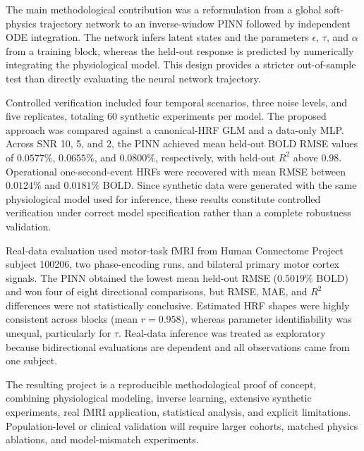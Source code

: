The main methodological contribution was a reformulation from a global soft-physics trajectory network to an inverse-window PINN followed by independent ODE integration. The network infers latent states and the parameters $\epsilon$, $\tau$, and $\alpha$ from a training block, whereas the held-out response is predicted by numerically integrating the physiological model. This design provides a stricter out-of-sample test than directly evaluating the neural network trajectory.

Controlled verification included four temporal scenarios, three noise levels, and five replicates, totaling 60 synthetic experiments per model. The proposed approach was compared against a canonical-HRF GLM and a data-only MLP. Across SNR 10, 5, and 2, the PINN achieved mean held-out BOLD RMSE values of $0.0577\%$, $0.0655\%$, and $0.0800\%$, respectively, with held-out $R^2$ above $0.98$. Operational one-second-event HRFs were recovered with mean RMSE between $0.0124\%$ and $0.0181\%$ BOLD. Since synthetic data were generated with the same physiological model used for inference, these results constitute controlled verification under correct model specification rather than a complete robustness validation.

Real-data evaluation used motor-task fMRI from Human Connectome Project subject 100206, two phase-encoding runs, and bilateral primary motor cortex signals. The PINN obtained the lowest mean held-out RMSE ($0.5019\%$ BOLD) and won four of eight directional comparisons, but RMSE, MAE, and $R^2$ differences were not statistically conclusive. Estimated HRF shapes were highly consistent across blocks (mean $r=0.958$), whereas parameter identifiability was unequal, particularly for $\tau$. Real-data inference was treated as exploratory because bidirectional evaluations are dependent and all observations came from one subject.

The resulting project is a reproducible methodological proof of concept, combining physiological modeling, inverse learning, extensive synthetic experiments, real fMRI application, statistical analysis, and explicit limitations. Population-level or clinical validation will require larger cohorts, matched physics ablations, and model-mismatch experiments.
